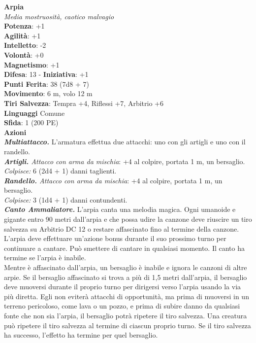 \begin{multicols}{2}
\medskip\textbf{Arpia}\\
\emph{Media mostruosità, caotico malvagio}\\
\textbf{Potenza}: +1\\
\textbf{Agilità}: +1\\
\textbf{Intelletto}: -2\\
\textbf{Volontà}: +0\\
\textbf{Magnetismo}: +1\\
\textbf{Difesa}: 13 - \textbf{Iniziativa}: +1\\
\textbf{Punti Ferita}: 38 (7d8 + 7)\\
\textbf{Movimento}: 6 m, volo 12 m\\
\textbf{Tiri Salvezza}: Tempra +4, Riflessi +7, Arbitrio +6\\
\textbf{Linguaggi} Comune\\
\textbf{Sfida}: 1 (200 PE)\smallskip\\
\smallskip\textbf{Azioni}\\
\emph{\textbf{Multiattacco.}} L'armatura effettua due attacchi: uno con gli artigli e uno con il randello.\\
\emph{\textbf{Artigli.} Attacco con arma da mischia}: +4 al colpire, portata 1 m, un bersaglio.\\
\emph{Colpisce:} 6 (2d4 + 1) danni taglienti.\\
\emph{\textbf{Randello.} Attacco con arma da mischia}: +4 al colpire, portata 1 m, un bersaglio.\\
\emph{Colpisce:} 3 (1d4 + 1) danni contundenti.\\
\emph{\textbf{Canto Ammaliatore.}} L'arpia canta una melodia magica. Ogni umanoide e gigante entro 90 metri dall'arpia e che possa udire la canzone deve riuscire un tiro salvezza su Arbitrio DC  12 o restare affascinato fino al termine della canzone. L'arpia deve effettuare un'azione bonus durante il suo prossimo turno per continuare a cantare. Può smettere di cantare in qualsiasi momento. Il canto ha termine se l'arpia è inabile.\\
Mentre è affascinato dall'arpia, un bersaglio è inabile e ignora le canzoni di altre arpie. Se il bersaglio affascinato si trova a più di 1,5 metri dall'arpia, il bersaglio deve muoversi durante il proprio turno per dirigersi verso l'arpia usando la via più diretta. Egli non eviterà attacchi di opportunità, ma prima di muoversi in un terreno pericoloso, come lava o un pozzo, e prima di subire danno da qualsiasi fonte che non sia l'arpia, il bersaglio potrà ripetere il tiro salvezza. Una creatura può ripetere il tiro salvezza al termine di ciascun proprio turno. Se il tiro salvezza ha successo, l'effetto ha termine per quel bersaglio.\\

\end{multicols}
